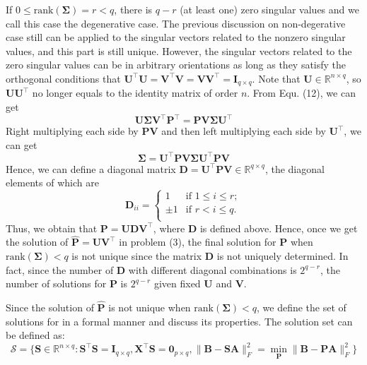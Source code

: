 \documentclass[titlepage,11pt,twoside]{article}
\begin{document}
If $0\le\text{rank}(\mathbf{\Sigma})=r< q$, there is $q-r$ (at least one) zero singular values and we call this case the degenerative case. The previous discussion on non-degerative case still can be applied to the singular vectors related to the nonzero singular values, and this part is still unique. However, the singular vectors related to the zero singular values can be in arbitrary orientations as long as they satisfy the orthogonal conditions that $\mathbf{U}^{\top}\mathbf{U}=\mathbf{V}^{\top}\mathbf{V}=\mathbf{V}\mathbf{V}^{\top}=\mathbf{I}_{q\times q}$. Note that $\mathbf{U}\in \mathbb{R}^{n\times q}$, so $\mathbf{U}\mathbf{U}^{\top}$ no longer equals to the identity matrix of order $n$. From Equ. (12), we can get 
\begin{equation}
\mathbf{U}\mathbf{\Sigma}\mathbf{V}^{\top}\mathbf{P}^{\top}
=
\mathbf{P}\mathbf{V}\mathbf{\Sigma}\mathbf{U}^{\top}
\end{equation}
Right multiplying each side by $\mathbf{P}\mathbf{V}$ and then left multiplying each side by $\mathbf{U}^{\top}$, we can get  
\begin{equation}
\mathbf{\Sigma}
=
\mathbf{U}^{\top}\mathbf{P}\mathbf{V}\mathbf{\Sigma}\mathbf{U}^{\top}\mathbf{P}\mathbf{V}
\end{equation}
Hence, we can define a diagonal matrix $\mathbf{D}=\mathbf{U}^{\top}\mathbf{P}\mathbf{V}\in\mathbb{R}^{q\times q}$, the diagonal elements of which are 
\begin{displaymath}
\mathbf{D}_{ii}= \left\{ \begin{array}{ll}
1 & \textrm{if $1\le i\le r$};\\
\pm 1 & \textrm{if $r< i \le q$}.\\
\end{array} \right.
\end{displaymath}
Thus, we obtain that $\mathbf{P}=\mathbf{U}\mathbf{D}\mathbf{V}^{\top}$, where $\mathbf{D}$ is defined above. Hence, once we get the solution of $\mathbf{\hat{P}}=\mathbf{U}\mathbf{V}^{\top}$ in problem (3), the final solution for $\mathbf{P}$ when $\text{rank}(\mathbf{\Sigma})<q$ is not unique since the matrix $\mathbf{D}$ is not uniquely determined. In fact, since the number of $\mathbf{D}$ with different diagonal combinations is $2^{q-r}$, the number of solutions for $\mathbf{P}$ is $2^{q-r}$ given fixed $\mathbf{U}$ and $\mathbf{V}$.

Since the solution of $\mathbf{\hat{P}}$ is not unique when $\text{rank}(\mathbf{\Sigma})<q$, we define the set of solutions for in a formal manner and discuss its properties. The solution set can be defined as:
\begin{equation}
\mathcal{S}=\{\mathbf{S}\in\mathbb{R}^{n\times q}: \mathbf{S}^{\top}\mathbf{S}=\mathbf{I}_{q\times q}, \mathbf{X}^{\top}\mathbf{S}=\mathbf{0}_{p\times q}, \|\mathbf{B}-\mathbf{S}\mathbf{A}\|_{F}^{2}=\min_{\mathbf{P}}\|\mathbf{B}-\mathbf{P}\mathbf{A}\|_{F}^{2}\}
\end{equation}
\end{document}
